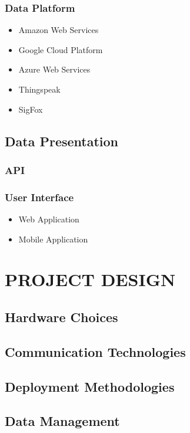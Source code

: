 \documentclass[10pt,twocolumn]{witseiepaper}
\begin{document}
		\subsubsection{Data Platform}
			\begin{itemize}
				\item Amazon Web Services
				\item Google Cloud Platform
				\item Azure Web Services
				\item Thingspeak
				\item SigFox
			\end{itemize}
	
	\subsection{Data Presentation}
		\subsubsection{API}
		\subsubsection{User Interface}
			\begin{itemize}
				\item Web Application
				\item Mobile Application
			\end{itemize}

\section{PROJECT DESIGN}
	\subsection{Hardware Choices}
	
	\subsection{Communication Technologies}
	
	\subsection{Deployment Methodologies}
	
	\subsection{Data Management}
\end{document}
